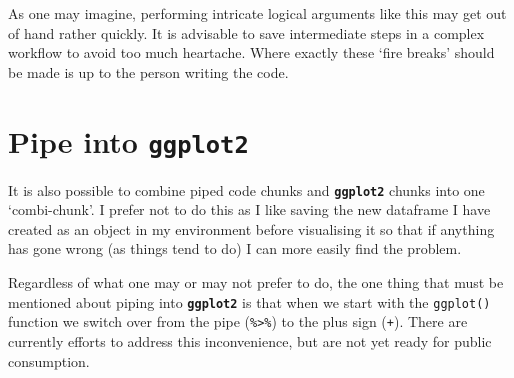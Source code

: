 \documentclass[]{book}
\theoremstyle{definition}
\theoremstyle{definition}
\theoremstyle{definition}
\theoremstyle{remark}
\begin{document}
As one may imagine, performing intricate logical arguments like this may
get out of hand rather quickly. It is advisable to save intermediate
steps in a complex workflow to avoid too much heartache. Where exactly
these `fire breaks' should be made is up to the person writing the code.

\section{\texorpdfstring{Pipe into
\textbf{\texttt{ggplot2}}}{Pipe into ggplot2}}\label{pipe-into-ggplot2}

It is also possible to combine piped code chunks and
\textbf{\texttt{ggplot2}} chunks into one `combi-chunk'. I prefer not to
do this as I like saving the new dataframe I have created as an object
in my environment before visualising it so that if anything has gone
wrong (as things tend to do) I can more easily find the problem.

Regardless of what one may or may not prefer to do, the one thing that
must be mentioned about piping into \textbf{\texttt{ggplot2}} is that
when we start with the \texttt{ggplot()} function we switch over from
the pipe (\texttt{\%\textgreater{}\%}) to the plus sign (\texttt{+}).
There are currently efforts to address this inconvenience, but are not
yet ready for public consumption.
\end{document}
